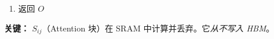 \begin{examplebox}
\begin{enumerate}
\begin{enumerate}
\begin{enumerate}
  \item 将 $Q_i, O_i, m_i, \ell_i$ 从 HBM 加载到 SRAM
  \item 计算 $S_{ij} = Q_i K_j^T / \sqrt{d}$（保留在 SRAM 中）
  \item 应用在线 Softmax 更新得到新的 $m_i, \ell_i, O_i$
  \item 将 $O_i, m_i, \ell_i$ 写回 HBM
\end{enumerate}
\end{enumerate}
  \item 返回 $O$
\end{enumerate}

\textbf{关键：} $S_{ij}$（Attention 块）在 SRAM 中计算并丢弃。它\emph{从不写入 HBM}。
\end{examplebox}


